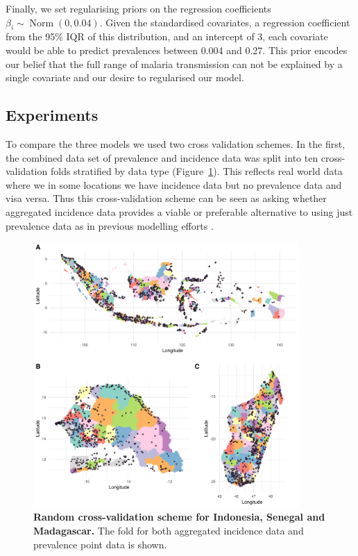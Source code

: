 \documentclass[10pt,letterpaper]{article}
\begin{document}
Finally, we set regularising priors on the regression coefficients $\beta_i \sim \operatorname{ Norm}(0, 0.04)$. 
Given the standardised covariates, a regression coefficient from the 95\% IQR of this distribution, and an intercept of 3, each covariate would be able to predict prevalences between 0.004 and 0.27. 
This prior encodes our belief that the full range of malaria transmission can not be explained by a single covariate and our desire to regularised our model.



\subsection*{Experiments}

To compare the three models we used two cross validation schemes. 
In the first, the combined data set of prevalence and incidence data was split into ten cross-validation folds stratified by data type (Figure~\ref{fig:cv_random}).
This reflects real world data where we in some locations we have incidence data but no prevalence data and visa versa.
Thus this cross-validation scheme can be seen as asking whether aggregated incidence data provides a viable or preferable alternative to using just prevalence data as in previous modelling efforts \cite{bhatt2015effect}.


\begin{figure}[!h]
\centering

\includegraphics[width = 0.9\textwidth]{figures/random_crossvalidation_full.png} %

\caption{{\bf Random cross-validation scheme for Indonesia, Senegal and Madagascar.} The fold for both aggregated incidence data and prevalence point data is shown.}
\label{fig:cv_random}
\end{figure}
\end{document}
